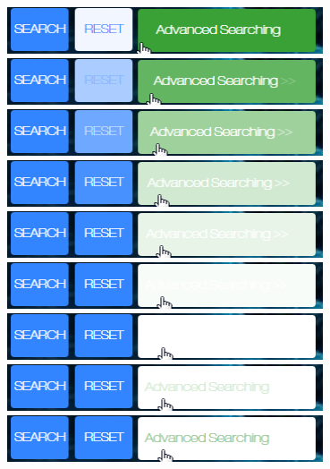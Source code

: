 \documentclass[10pt,twoside,a4paper,titlepage]{article}
\begin{document}
	\newline
	\includegraphics[width=0.7\textwidth]{cyf/Advanced_searching2.png}
	\newline
	\includegraphics[width=0.7\textwidth]{cyf/Advanced_searching3.png}
	\newline	
	\includegraphics[width=0.7\textwidth]{cyf/Advanced_searching4.png}
	\newline	
	\includegraphics[width=0.7\textwidth]{cyf/Advanced_searching5.png}
	\newline	
	\includegraphics[width=0.7\textwidth]{cyf/Advanced_searching6.png}
	\newline	
	\includegraphics[width=0.7\textwidth]{cyf/Advanced_searching7.png}
	\newline
	\includegraphics[width=0.7\textwidth]{cyf/Advanced_searching8.png}
	\newline
	\includegraphics[width=0.7\textwidth]{cyf/Advanced_searching9.png}
	\newline
	\includegraphics[width=0.7\textwidth]{cyf/Advanced_searching10.png}
\end{document}
